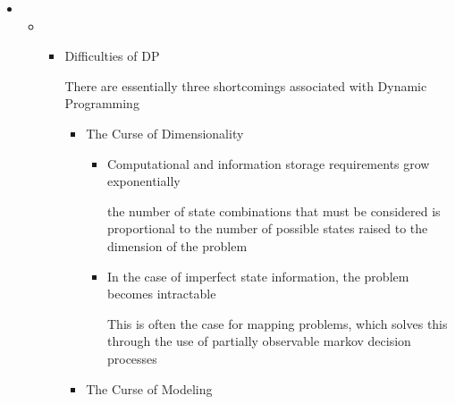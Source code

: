 \documentclass[12pt,twoside]{article}
\begin{document}
\vspace{\baselineskip}
\begin{itemize}
	\item \begin{itemize}
	\item \begin{itemize}
	\item Difficulties of DP\par


\vspace{\baselineskip}
{\fontsize{10pt}{12.0pt}\selectfont There are essentially three shortcomings associated with Dynamic Programming\par}\par


\vspace{\baselineskip}
\begin{itemize}
	\item {\fontsize{10pt}{12.0pt}\selectfont The Curse of Dimensionality\par}\par

\begin{itemize}
	\item {\fontsize{10pt}{12.0pt}\selectfont Computational and information storage requirements grow exponentially\par}\par

{\fontsize{10pt}{12.0pt}\selectfont the number of state combinations that must be considered is proportional to the number of possible states raised to the dimension of the problem\par}\par

	\item {\fontsize{10pt}{12.0pt}\selectfont In the case of imperfect state information, the problem becomes intractable\par}\par

{\fontsize{10pt}{12.0pt}\selectfont This is often the case for mapping problems, which solves this through the use of partially observable markov decision processes\par}\par


\end{itemize}
	\item {\fontsize{10pt}{12.0pt}\selectfont The Curse of Modeling\par}\par


\end{itemize}
\end{itemize}
\end{itemize}
\end{itemize}
\end{document}
